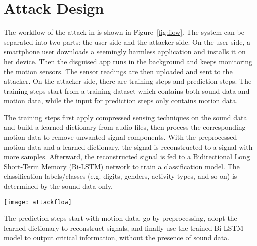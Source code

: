 

\section{Attack Design}\label{sec:design}


The workflow of the {\attackName} attack in {\systemName} is shown in Figure~\ref{fig:flow}. The system can be separated into two parts: the user side and the attacker side. 
%
On the user side, a smartphone user downloads a seemingly harmless application and installs it on her device. Then the disguised app runs in the background and keeps monitoring the motion sensors. The sensor readings are then uploaded and sent to the attacker. 
%
On the attacker side, there are training steps and prediction steps. The training steps start from a training dataset which contains both sound data and motion data, while the input for prediction steps only contains motion data. 

The training steps first apply compressed sensing techniques on the sound data and build a learned dictionary from audio files, then process the corresponding motion data to remove unwanted signal components. With the preprocessed motion data and a learned dictionary,  the signal is reconstructed to a signal with more samples. Afterward, the reconstructed signal is fed to a Bidirectional Long Short-Term Memory (Bi-LSTM) network to train a classification model. 
The classification labels/classes (e.g. digits, genders, activity types, and so on) is determined by the sound data only.


\begin{landscape}
\begin{figure*}[h]
	\centering
	\texttt{[image: attackflow]}
	\caption{The {\attackName} Attack Workflow in the {\systemName} System. }
	\label{fig:flow}
\end{figure*}
\end{landscape}


The prediction steps start with motion data, go by preprocessing, adopt the learned dictionary to reconstruct signals, and finally use the trained Bi-LSTM model to output critical information, without the presence of sound data.



